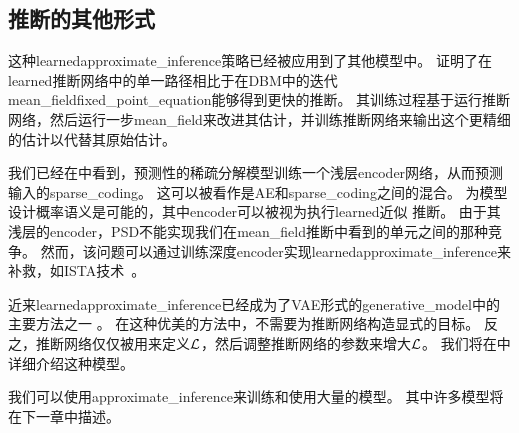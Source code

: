 \subsection{推断的其他形式}
\label{sec:other_forms_of_learned_inference}

这种\gls{learned}\gls{approximate_inference}策略已经被应用到了其他模型中。
\citet{Salakhutdinov+Larochelle-2010}证明了在\gls{learned}推断网络中的单一路径相比于在\gls{DBM}中的迭代\gls{mean_field}\gls{fixed_point_equation}能够得到更快的推断。
其训练过程基于运行推断网络，然后运行一步\gls{mean_field}来改进其估计，并训练推断网络来输出这个更精细的估计以代替其原始估计。


我们已经在中看到，预测性的稀疏分解模型训练一个浅层\gls{encoder}网络，从而预测输入的\gls{sparse_coding}。
这可以被看作是\gls{AE}和\gls{sparse_coding}之间的混合。
为模型设计概率语义是可能的，其中\gls{encoder}可以被视为执行\gls{learned}近似\,\,推断。
由于其浅层的\gls{encoder}，PSD不能实现我们在\gls{mean_field}推断中看到的单元之间的那种竞争。
然而，该问题可以通过训练深度\gls{encoder}实现\gls{learned}\gls{approximate_inference}来补救，如ISTA技术~\citep{Gregor+LeCun-ICML2010}。


近来\gls{learned}\gls{approximate_inference}已经成为了\gls{VAE}形式的\gls{generative_model}中的主要方法之一 \citep{Kingma+Welling-ICLR2014,Rezende-et-al-ICML2014}。
在这种优美的方法中，不需要为推断网络构造显式的目标。
反之，推断网络仅仅被用来定义$\mathcal{L}$，然后调整推断网络的参数来增大$\mathcal{L}$。
我们将在中详细介绍这种模型。

我们可以使用\gls{approximate_inference}来训练和使用大量的模型。
其中许多模型将在下一章中描述。















